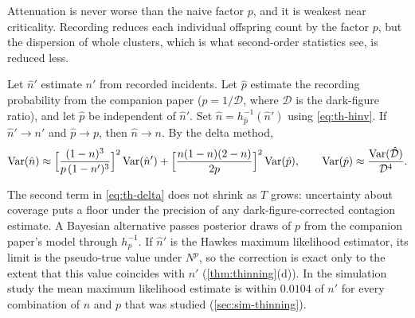 Attenuation is never worse than the naive factor $p$, and it is weakest near
criticality. Recording reduces each individual offspring count by the factor $p$, but
the dispersion of whole clusters, which is what second-order statistics see, is
reduced less.

\begin{corollary}\label{cor:th-darkfig}
Let $\hat n'$ estimate $n'$ from recorded incidents. Let $\hat p$ estimate the
recording probability from the companion paper \citep{kornsteinlab2026darkfigure} ($p=1/\mathcal D$, where $\mathcal D$ is the dark-figure ratio), and
let $\hat p$ be independent of $\hat n'$. Set $\hat n=h_{\hat p}^{-1}(\hat n')$ using
\eqref{eq:th-hinv}. If $\hat n'\to n'$ and $\hat p\to p$, then $\hat n\to n$. By the
delta method,
\begin{equation}\label{eq:th-delta}
  \operatorname{Var}(\hat n)\approx\Big[\frac{(1-n)^3}{p\,(1-n')^3}\Big]^2\operatorname{Var}(\hat n')
  +\Big[\frac{n(1-n)(2-n)}{2p}\Big]^2\operatorname{Var}(\hat p),
  \qquad \operatorname{Var}(\hat p)\approx\frac{\operatorname{Var}(\hat{\mathcal D})}{\mathcal D^4}.
\end{equation}
\end{corollary}

The second term in \eqref{eq:th-delta} does not shrink as $T$ grows: uncertainty about
coverage puts a floor under the precision of any dark-figure-corrected contagion
estimate. A Bayesian alternative passes posterior draws of $p$ from the companion paper's model through
$h_p^{-1}$. If $\hat n'$ is the Hawkes maximum likelihood estimator, its limit is the
pseudo-true value under $N^p$, so the correction is exact only to the extent that this
value coincides with $n'$ (\cref{thm:thinning}(d)). In the simulation study the mean
maximum likelihood estimate is within $0.0104$ of $n'$ for every combination of $n$ and $p$
that was studied (\cref{sec:sim-thinning}).

